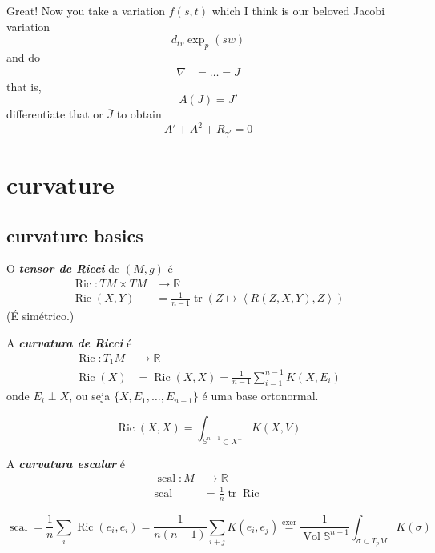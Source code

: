 Great! Now you take a variation \(f(s,t)\) which I think is our beloved Jacobi variation
\[d_{tv}\operatorname{exp}_p(sw)\]
and do
\begin{align*}
\nabla &= \ldots=J
\end{align*}
that is,
\[A(J)=J'\]
differentiate that or \(\overline{J}\) to obtain
\[A'+A^2+R_{\gamma'}=0\]

\section{curvature}

\subsection{curvature basics}

O \textit{\textbf{tensor de Ricci}} de \((M,g)\) é
\begin{align*}
	\operatorname{Ric}: TM \times TM &\longrightarrow  \mathbb{R}\\
	 \operatorname{Ric}(X,Y)&= \frac{1}{n-1}\operatorname{tr}(Z  \mapsto \left<R(Z,X,Y),Z\right>)
\end{align*}
(É simétrico.)

A \textit{\textbf{curvatura de Ricci}} é
\begin{align*}
	\operatorname{Ric}: T_1M &\longrightarrow \mathbb{R} \\
	\operatorname{Ric}(X) &=\operatorname{Ric}(X,X)=\frac{1}{n-1}\sum_{i=1}^{n-1}K(X,E_i)
\end{align*}
onde \(E_i \perp X\), ou seja \(\{X,E_1,\ldots,E_{n-1}\}\) é uma base ortonormal.

\begin{remark}[conferir!]\leavevmode
\[\operatorname{Ric}(X,X)=\int_{\mathbb{S}^{n-1}\subset X^\perp}K(X,V)\]

\end{remark}

A \textit{\textbf{curvatura escalar}} é
\begin{align*}
	\operatorname{scal}: M &\longrightarrow \mathbb{R} \\
	\operatorname{scal} &=\frac{1}{n}\operatorname{tr}\operatorname{Ric} 
\end{align*}

\begin{exercise}\leavevmode
\[\operatorname{scal}=\frac{1}{n}\sum_{i}\operatorname{Ric}(e_i,e_i)=\frac{1}{n(n-1)}\sum_{i+j}K(e_i,e_j)\overset{\text{exer} }{=}\frac{1}{\operatorname{Vol}\mathbb{S}^{n-1}}\int_{\sigma \subset T_pM}K(\sigma)\]

\end{exercise}

